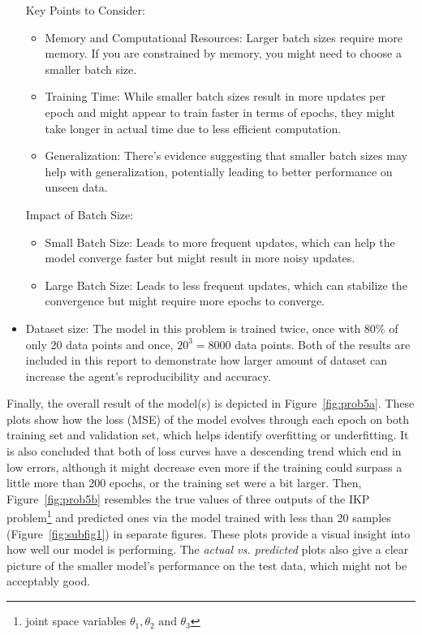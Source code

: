 \documentclass[conference]{IEEEtran}
\begin{document}
\begin{itemize}
          Key Points to Consider:
          \begin{itemize}
              \item Memory and Computational Resources: Larger batch sizes require more memory. If you are constrained by memory, you might need to choose a smaller batch size.
              \item Training Time: While smaller batch sizes result in more updates per epoch and might appear to train faster in terms of epochs, they might take longer in actual time due to less efficient computation.
              \item Generalization: There's evidence suggesting that smaller batch sizes may help with generalization, potentially leading to better performance on unseen data.
          \end{itemize}
          Impact of Batch Size:
          \begin{itemize}
              \item Small Batch Size: Leads to more frequent updates, which can help the model converge faster but might result in more noisy updates.
              \item Large Batch Size: Leads to less frequent updates, which can stabilize the convergence but might require more epochs to converge.
          \end{itemize}
    \item Dataset size: The model in this problem is trained twice, once with $80\%$ of only 20 data points and once, $20^3=8000$ data points. Both of the results are included in this report to demonstrate how larger amount of dataset can increase the agent's reproducibility and accuracy.
\end{itemize}

\vspace{35px}

Finally, the overall result of the model(s) is depicted in Figure~\ref{fig:prob5a}. These plots show how the loss (MSE) of the model evolves through each epoch on both training set and validation set, which helps identify overfitting or underfitting. It is also concluded that both of loss curves have a descending trend which end in low errors, although it might decrease even more if the training could surpass a little more than 200 epochs, or the training set were a bit larger. Then, Figure~\ref{fig:prob5b} resembles the true values of three outputs of the IKP problem\footnote{joint space variables $\theta_1, \theta_2 \text{ and } \theta_3$} and predicted ones via the model trained with less than 20 samples (Figure~\ref{fig:subfig1}) in separate figures. These plots provide a visual insight into how well our model is performing. The \textit{actual vs. predicted} plots also give a clear picture of the smaller model's performance on the test data, which might not be acceptably good.
\end{document}

